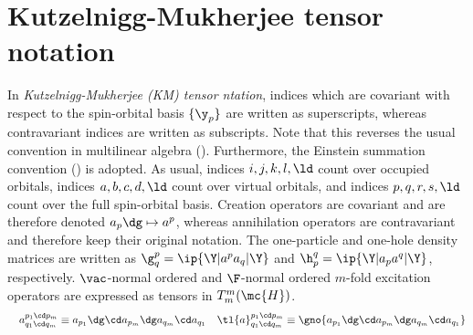 \documentclass[11pt,fleqn]{article}
\numberwithin{equation}{section}
\begin{document}
\section{Kutzelnigg-Mukherjee tensor notation}

\begin{ntt}
In \textit{Kutzelnigg-Mukherjee (KM) tensor ntation}, indices which are covariant with respect to the spin-orbital basis $\{\y_p\}$ are written as superscripts, whereas contravariant indices are written as subscripts.
Note that this reverses the usual convention in multilinear algebra ().
Furthermore, the Einstein summation convention () is adopted.
As usual, indices $i,j,k,l,\ld$ count over occupied orbitals, indices $a,b,c,d,\ld$ count over virtual orbitals, and indices $p,q,r,s,\ld$ count over the full spin-orbital basis.
Creation operators are covariant and are therefore denoted $a_p\dg \mapsto a^p$, whereas annihilation operators are contravariant and therefore keep their original notation.
The one-particle and one-hole density matrices are written as $\g_q^p=\ip{\Y|a^pa_q|\Y}$ and $\h_p^q=\ip{\Y|a_pa^q|\Y}$, respectively.
$\vac$-normal ordered and $\F$-normal ordered $m$-fold excitation operators are expressed as tensors in $T_m^m(\mc{H})$.
\begin{align}
&&
  a^{p_1\cd p_m}_{q_1\cd q_m}
\equiv
  a_{p_1}\dg \cd a_{p_m}\dg a_{q_m}\cd a_{q_1}
&&
  \tl{a}^{p_1\cd p_m}_{q_1\cd q_m}
\equiv
  \gno{a_{p_1}\dg \cd a_{p_m}\dg a_{q_m}\cd a_{q_1}}
\end{align}
\end{ntt}
\end{document}
